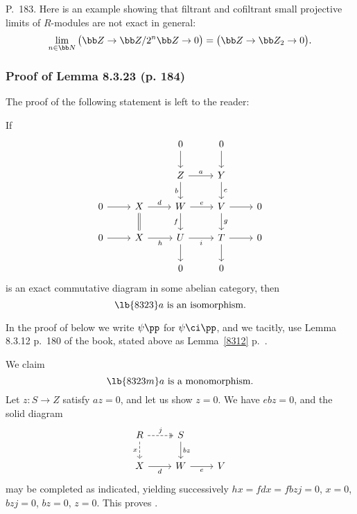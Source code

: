 \documentclass[12pt]{article}
\theoremstyle{remark}
\theoremstyle{definition}
\begin{document}
%

\begin{s} 
P.~183. Here is an example showing that filtrant and cofiltrant small projective limits of $R$-modules are not exact in general: 
$$
\lim_{n\in\bb N}\big(\bb Z\to\bb Z/2^n\bb Z\to0\big)=\big(\bb Z\to\bb Z_2\to0\big).
$$
\end{s}


\subsubsection{Proof of Lemma 8.3.23 (p. 184)}

The proof of the following statement is left to the reader:

If 
$$
\begin{tikzcd}
&&0\ar[d]&0\ar[d]\\ 
&&Z\ar[d,"b"']\ar[r,"a"]&Y\ar[d,"c"]\\ 
0\ar[r]&X\ar[d,equal]\ar[r,"d"]&W\ar[d,"f"']\ar[r,"e"]&V\ar[d,"g"]\ar[r]&0\\ 
0\ar[r]&X\ar[r,"h"']&U\ar[d]\ar[r,"i"']&T\ar[d]\ar[r]&0\\ 
&&0&0
\end{tikzcd}
$$ 
is an exact commutative diagram in some abelian category, then 
\begin{equation}\lb{8323}
a\text{ is an isomorphism}.
\end{equation} 

In the proof of  below we write $\psi\pp$ for $\psi\ci\pp$, and we tacitly, use Lemma 8.3.12 p.~180 of the book, stated above as Lemma~\ref{8312} p.~. 

We claim
\begin{equation}\lb{8323m}
a\text{ is a monomorphism}.
\end{equation}
Let $z:S\to Z$ satisfy $az=0$, and let us show $z=0$. We have $ebz=0$, and the solid diagram 
$$
\begin{tikzcd}
R\ar[d,"x"',dashed]\ar[r,"j",dashed,two heads]&S\ar[d,"bz"]\\ 
X\ar[r,"d"']&W\ar[r,"e"']&V
\end{tikzcd}
$$ 
may be completed as indicated, yielding successively $hx=fdx=fbzj=0$, $x=0$, $bzj=0$, $bz=0$, $z=0$. This proves . 
\end{document}
